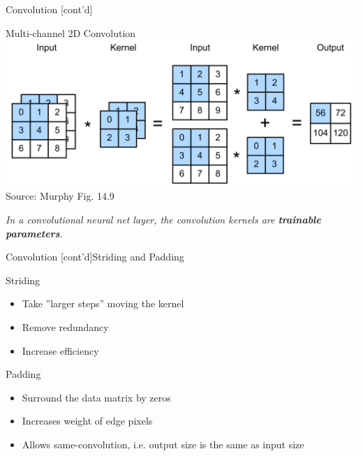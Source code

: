 \documentclass[ignorenonframetext,xcolor=x11names]{beamer}
\begin{document}
\begin{frame}{Convolution \small [cont'd]}
\begin{block}{Multi-channel 2D Convolution}
\centering
\includegraphics[width=.8\textwidth]{screen3.png} \\

\scriptsize Source: Murphy Fig. 14.9
\end{block}
\vspace{\baselineskip}
\emph{In a convolutional neural net layer, the convolution kernels are \textbf{trainable parameters}}.
\end{frame}

\begin{frame}{Convolution \small [cont'd]}{Striding and Padding}
\begin{block}{Striding}
   \begin{itemize} 
       \item Take ''larger steps'' moving the kernel
       \item Remove redundancy
       \item Increase efficiency
   \end{itemize}
\end{block}
\begin{block}{Padding}
   \begin{itemize}
       \item Surround the data matrix by zeros
       \item Increases weight of edge pixels
       \item Allows same-convolution, i.e. output size is the same as input size
   \end{itemize}
\end{block}
\end{frame}
\end{document}
